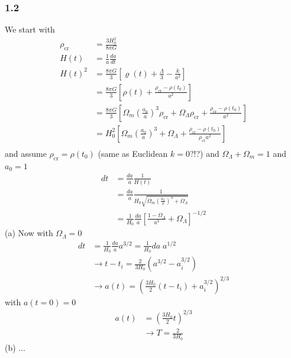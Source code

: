 \documentclass[10pt,a4paper]{book}
\theoremstyle{definition}
\begin{document}
\subsubsection{1.2}
We start with 
\begin{align}
\rho_\text{cr}&=\frac{3H_0^2}{8\pi G}\\
H(t)&=\frac{1}{a}\frac{da}{dt}\\
H(t)^2
&=\frac{8\pi G}{3}\left[\varrho(t)+\frac{\Lambda}{3}-\frac{k}{a^2}\right]\\
&=\frac{8\pi G}{3}\left[\rho(t)+\frac{\rho_\text{cr}-\rho(t_0)}{a^2}\right]\\
&=\frac{8\pi G}{3}\left[\Omega_m\left(\frac{a_0}{a}\right)^3\rho_\text{cr}+\Omega_\Lambda\rho_\text{cr}+\frac{\rho_\text{cr}-\rho(t_0)}{a^2}\right]\\
&=H_0^2\left[\Omega_m\left(\frac{a_0}{a}\right)^3+\Omega_\Lambda+\frac{\rho_\text{cr}-\rho(t_0)}{\rho_\text{cr}a^2}\right]\\
\end{align}
and assume $\rho_\text{cr}=\rho(t_0)$ (same as Euclidean $k=0$?!?) and $\Omega_\Lambda+\Omega_m=1$ and $a_0=1$
\begin{align}
dt&=\frac{da}{a}\frac{1}{H(t)}\\
&=\frac{da}{a}\frac{1}{H_0\sqrt{\Omega_m\left(\frac{a_0}{a}\right)^3+\Omega_\Lambda}}\\
&=\frac{1}{H_0}\frac{da}{a}\left[\frac{1-\Omega_\Lambda}{a^3}+\Omega_\Lambda\right]^{-1/2}
\end{align}
(a) Now with $\Omega_\Lambda=0$
\begin{align}
dt&=\frac{1}{H_0}\frac{da}{a}a^{3/2}=\frac{1}{H_0}da\;a^{1/2}\\
&\rightarrow t-t_i=\frac{2}{3H_0}(a^{3/2}-a_i^{3/2})\\
&\rightarrow a(t)=\left(\frac{3H_0}{2}(t-t_i)+a_i^{3/2}\right)^{2/3}
\end{align}
with $a(t=0)=0$
\begin{align}
a(t)&=\left(\frac{3H_0}{2}t\right)^{2/3}\\
&\rightarrow T=\frac{2}{3H_0}
\end{align}
(b) ...
\end{document}

